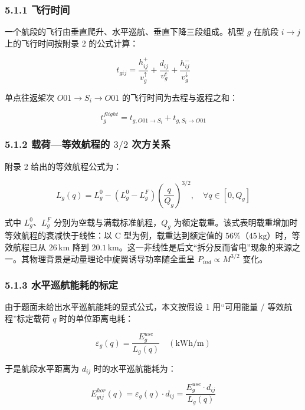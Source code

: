 \documentclass[withoutpreface,bwprint]{format}
\begin{document}
\subsubsection{5.1.1 飞行时间}
一个航段的飞行由垂直爬升、水平巡航、垂直下降三段组成。机型 $g$ 在航段 $i \to j$ 上的飞行时间按附录 2 的公式计算：

\begin{equation}
t_{gij} = \frac{h_{ij}^+}{v_g^\uparrow} + \frac{d_{ij}}{v_g^c} + \frac{h_{ij}^-}{v_g^\downarrow}
\end{equation}

单点往返架次 $O01 \to S_i \to O01$ 的飞行时间为去程与返程之和：

\begin{equation}
t_g^{flight} = t_{g, O01 \to S_i} + t_{g, S_i \to O01}
\end{equation}

\subsubsection{\texorpdfstring{5.1.2 载荷—等效航程的 $3/2$ 次方关系}{5.1.2 载荷—等效航程的 3/2 次方关系}}
附录 2 给出的等效航程公式为：

\begin{equation}
L_g(q) = L_g^0 - (L_g^0 - L_g^F) \left(\frac{q}{Q_g}\right)^{3/2}, \quad \forall q \in [0, Q_g]
\label{eq:range_32}
\end{equation}

式中 $L_g^0$、$L_g^F$ 分别为空载与满载标准航程，$Q_g$ 为额定载重。该式表明载重增加时等效航程的衰减快于线性：以 C 型为例，载重达到额定值的 $56\%$（$45\,\text{kg}$）时，等效航程已从 $26\,\text{km}$ 降到 $20.1\,\text{km}$。这一非线性是后文“拆分反而省电”现象的来源之一。其物理背景是动量理论中旋翼诱导功率随全重呈 $P_{ind}\propto M^{3/2}$ 变化\cite{leishman2006}。

\subsubsection{5.1.3 水平巡航能耗的标定}
由于题面未给出水平巡航能耗的显式公式，本文按假设 1 用“可用能量 / 等效航程”标定载荷 $q$ 时的单位距离电耗：

\begin{equation}
\varepsilon_g(q) = \frac{E_g^{use}}{L_g(q)} \quad (\text{kWh/m})
\end{equation}

于是航段水平距离为 $d_{ij}$ 时的水平巡航能耗为：

\begin{equation}
E_{gij}^{hor}(q) = \varepsilon_g(q) \cdot d_{ij} = \frac{E_g^{use} \cdot d_{ij}}{L_g(q)}
\end{equation}
\end{document}
